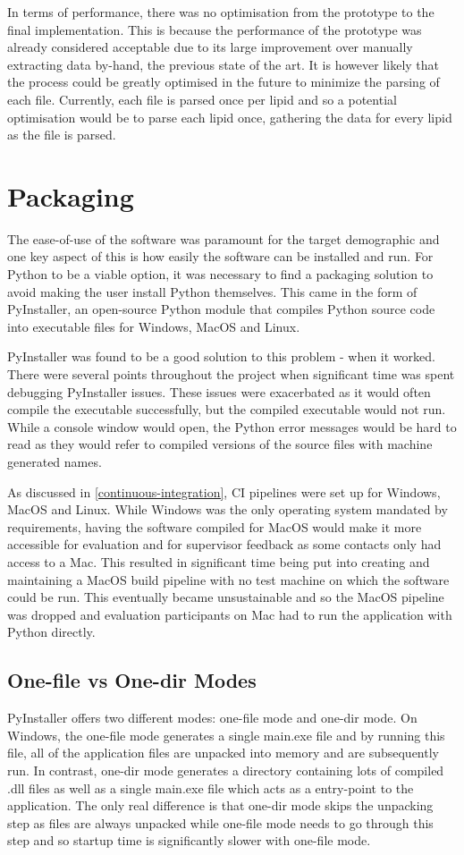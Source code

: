 \documentclass{l4proj}
\begin{document}
In terms of performance, there was no optimisation from the prototype to the final implementation. This is because the performance of the prototype was already considered acceptable due to its large improvement over manually extracting data by-hand, the previous state of the art. It is however likely that the process could be greatly optimised in the future to minimize the parsing of each file. Currently, each file is parsed once per lipid and so a potential optimisation would be to parse each lipid once, gathering the data for every lipid as the file is parsed.

\section{Packaging}
The ease-of-use of the software was paramount for the target demographic and one key aspect of this is how easily the software can be installed and run. For Python to be a viable option, it was necessary to find a packaging solution to avoid making the user install Python themselves. This came in the form of PyInstaller, an open-source Python module that compiles Python source code into executable files for Windows, MacOS and Linux.

PyInstaller was found to be a good solution to this problem - when it worked. There were several points throughout the project when significant time was spent debugging PyInstaller issues. These issues were exacerbated as it would often compile the executable successfully, but the compiled executable would not run. While a console window would open, the Python error messages would be hard to read as they would refer to compiled versions of the source files with machine generated names.

As discussed in \ref{continuous-integration}, CI pipelines were set up for Windows, MacOS and Linux. While Windows was the only operating system mandated by requirements, having the software compiled for MacOS would make it more accessible for evaluation and for supervisor feedback as some contacts only had access to a Mac. This resulted in significant time being put into creating and maintaining a MacOS build pipeline with no test machine on which the software could be run. This eventually became unsustainable and so the MacOS pipeline was dropped and evaluation participants on Mac had to run the application with Python directly.

\subsection{One-file vs One-dir Modes}
PyInstaller offers two different modes: one-file mode and one-dir mode. On Windows, the one-file mode generates a single main.exe file and by running this file, all of the application files are unpacked into memory and are subsequently run. In contrast, one-dir mode generates a directory containing lots of compiled .dll files as well as a single main.exe file which acts as a entry-point to the application. The only real difference is that one-dir mode skips the unpacking step as files are always unpacked while one-file mode needs to go through this step and so startup time is significantly slower with one-file mode.
\end{document}
